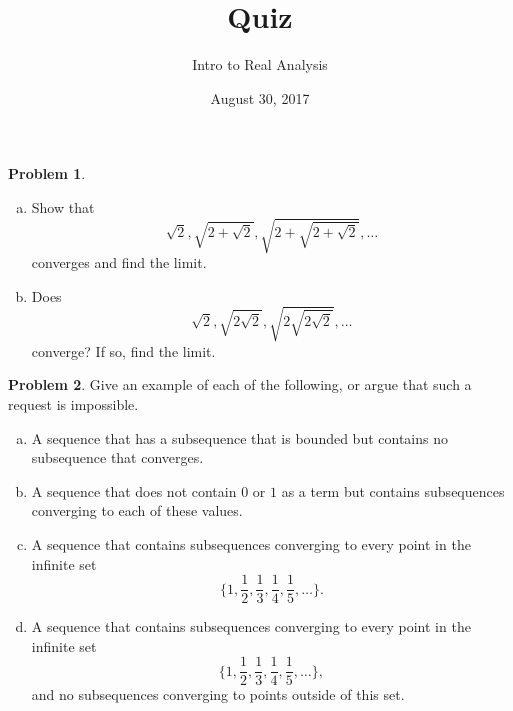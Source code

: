 \documentclass{amsart}
\newcommand{\+}[1]{\ensuremath{\mathbf{#1}}}
\theoremstyle{definition}
\newtheorem{prob}{Problem}
\begin{document}
\title{Quiz}
\date{August 30, 2017}
\author{Intro to Real Analysis}

\maketitle




\begin{prob}
\begin{enumerate}[(a)]
\item Show that 
\[\sqrt{2}, \sqrt{2+\sqrt{2}}, \sqrt{2+\sqrt{2+\sqrt{2}}}, \ldots\]
converges and find the limit.
\item Does
\[\sqrt{2}, \sqrt{2\sqrt{2}}, \sqrt{2\sqrt{2\sqrt{2}}}, \ldots\]
converge? If so, find the limit.
\end{enumerate}
\end{prob}

\begin{prob}
 Give an example of each of the following, or argue that such a request is impossible.
   \vspace{2mm}
 \begin{enumerate}[(a)]
  \item A sequence that has a subsequence that is bounded but contains no subsequence that converges.
  \vspace{2mm}
  \item A sequence that does not contain $0$ or $1$ as a term but contains subsequences converging to each of these values.
  \vspace{2mm}
  \item A sequence that contains subsequences converging to every point in the infinite set 
  \[\{1, \frac{1}{2}, \frac{1}{3}, \frac{1}{4}, \frac{1}{5}, \ldots\}.\] 
   \vspace{2mm}
   \item A sequence that contains subsequences converging to every point in the infinite set 
   \[\{1, \frac{1}{2}, \frac{1}{3}, \frac{1}{4}, \frac{1}{5}, \ldots\},\] 
   and no subsequences converging to points outside of this set. 
 \end{enumerate}
\end{prob}
\end{document}
